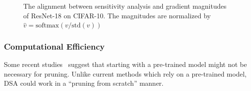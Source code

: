 \documentclass[runningheads]{llncs}
\newcommand{\dsa}{DSA\xspace}
\begin{document}
  \begin{figure}[ht]
    \begin{center}
      \caption{The alignment between sensitivity analysis and gradient magnitudes of ResNet-18 on CIFAR-10. The magnitudes are normalized by $\hat{v}=\mbox{softmax}(v/\mbox{std}(v))$}
      \label{fig:sens_res18}
    \end{center}
  \end{figure}

  \subsubsection{Computational Efficiency}
  
  
  
  Some recent studies~\cite{rethinking,PFS} suggest that starting with a pre-trained model might not be necessary for pruning. Unlike current methods which rely on a pre-trained model, \dsa could work in a ``pruning from scratch'' manner. 
\end{document}
